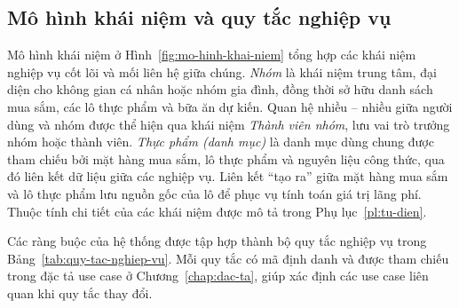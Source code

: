 \subsection{Mô hình khái niệm và quy tắc nghiệp vụ}\label{ssec:mo-hinh-khai-niem}

Mô hình khái niệm ở Hình~\ref{fig:mo-hinh-khai-niem} tổng hợp các khái niệm nghiệp vụ cốt lõi và mối liên hệ giữa chúng. \emph{Nhóm} là khái niệm trung tâm, đại diện cho không gian cá nhân hoặc nhóm gia đình, đồng thời sở hữu danh sách mua sắm, các lô thực phẩm và bữa ăn dự kiến. Quan hệ nhiều – nhiều giữa người dùng và nhóm được thể hiện qua khái niệm \emph{Thành viên nhóm}, lưu vai trò trưởng nhóm hoặc thành viên. \emph{Thực phẩm (danh mục)} là danh mục dùng chung được tham chiếu bởi mặt hàng mua sắm, lô thực phẩm và nguyên liệu công thức, qua đó liên kết dữ liệu giữa các nghiệp vụ. Liên kết “tạo ra” giữa mặt hàng mua sắm và lô thực phẩm lưu nguồn gốc của lô để phục vụ tính toán giá trị lãng phí. Thuộc tính chi tiết của các khái niệm được mô tả trong Phụ lục~\ref{pl:tu-dien}.


Các ràng buộc của hệ thống được tập hợp thành bộ quy tắc nghiệp vụ trong Bảng~\ref{tab:quy-tac-nghiep-vu}. Mỗi quy tắc có mã định danh và được tham chiếu trong đặc tả use case ở Chương~\ref{chap:dac-ta}, giúp xác định các use case liên quan khi quy tắc thay đổi.

